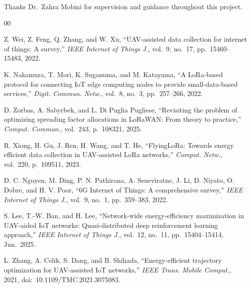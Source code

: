 \documentclass[conference]{IEEEtran}
\begin{document}
Thanks Dr.\ Zahra Mobini for supervision and guidance throughout this project.

\begin{thebibliography}{00}

Z. Wei, Z. Feng, Q. Zhang, and W. Xu,
``UAV-assisted data collection for internet of things: A survey,''
\textit{IEEE Internet of Things J.}, vol.~9, no.~17, pp.~15460--15483, 2022.

K. Nakamura, T. Mori, K. Suganuma, and M. Katayama,
``A LoRa-based protocol for connecting IoT edge computing nodes
to provide small-data-based services,''
\textit{Digit. Commun. Netw.}, vol.~8, no.~3, pp.~257--266, 2022.

D. Zorbas, A. Sabyrbek, and L. Di Puglia Pugliese,
``Revisiting the problem of optimizing spreading factor allocations
in LoRaWAN: From theory to practice,''
\textit{Comput. Commun.}, vol.~243, p.~108321, 2025.

R. Xiong, H. Gu, J. Ren, H. Wang, and T. He,
``FlyingLoRa: Towards energy efficient data collection
in UAV-assisted LoRa networks,''
\textit{Comput. Netw.}, vol.~220, p.~109511, 2023.

D. C. Nguyen, M. Ding, P. N. Pathirana, A. Seneviratne, J. Li,
D. Niyato, O. Dobre, and H. V. Poor,
``6G Internet of Things: A comprehensive survey,''
\textit{IEEE Internet of Things J.}, vol.~9, no.~1, pp.~359--383, 2022.

S. Lee, T.-W. Ban, and H. Lee,
``Network-wide energy-efficiency maximization in UAV-aided IoT networks:
Quasi-distributed deep reinforcement learning approach,''
\textit{IEEE Internet of Things J.}, vol.~12, no.~11,
pp.~15404--15414, Jun.~2025.

L. Zhang, A. Celik, S. Dang, and B. Shihada,
``Energy-efficient trajectory optimization for UAV-assisted IoT networks,''
\textit{IEEE Trans. Mobile Comput.}, 2021,
doi:~10.1109/TMC.2021.3075083.

\end{thebibliography}
\end{document}
